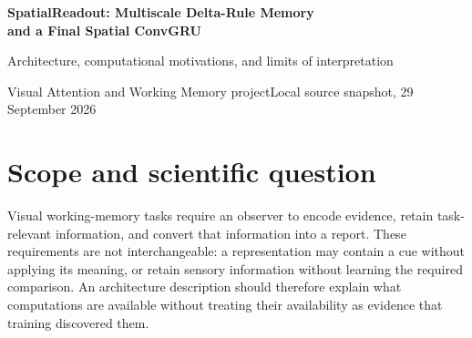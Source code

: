 \documentclass[10pt,letterpaper]{article}
\begin{document}
\thispagestyle{empty}
{\color{ink}\LARGE\bfseries SpatialReadout: Multiscale Delta-Rule Memory\\[3pt] and a Final Spatial ConvGRU\par}
\vspace{8pt}
{\large Architecture, computational motivations, and limits of interpretation}\par
\vspace{4pt}
{\small Visual Attention and Working Memory project\quad\textbullet\quad Local source snapshot, 29 September 2026}
\vspace{8pt}
\begin{abstract}
\noindent This paper specifies the current \texttt{SpatialReadout} model, rather than its historical global-GRU predecessor or an isolated KDA module. Centered, three-frame RGB stacks pass through four convolutional blocks. Three spatial Kimi Delta Attention (KDA) accumulators, interleaved at $25\times25$, $13\times13$, and $7\times7$, contribute local associative memory to the feedforward hierarchy. The deepest $160\times7\times7$ field is projected to 64 channels and integrated by a final convolutional gated recurrent unit (ConvGRU). Only its terminal $64\times7\times7$ state is flattened and projected to 256 features for a task-specific linear head. An independent CPU constructor audit gives \textbf{1,383,028 trainable parameters}. We derive the exact decay--correction--read update, its signed temporal coefficients, and the implemented write/reset convention. The principal design decision is to postpone \emph{global} compression until after final recurrence, while retaining spatially organized encoder memory. This supplies an inductive bias, not proof of better retention, comparison learning, or biological equivalence. We distinguish documented design intent from plausible but untested explanations, and separate the current fresh-origin training lineage from an earlier warm-start branch. No training, trained-model inference, or new behavioral experiment was performed for this paper.
\end{abstract}
\section{Scope and scientific question}
Visual working-memory tasks require an observer to encode evidence, retain task-relevant information, and convert that information into a report. These requirements are not interchangeable: a representation may contain a cue without applying its meaning, or retain sensory information without learning the required comparison. An architecture description should therefore explain what computations are available without treating their availability as evidence that training discovered them.
\end{document}
